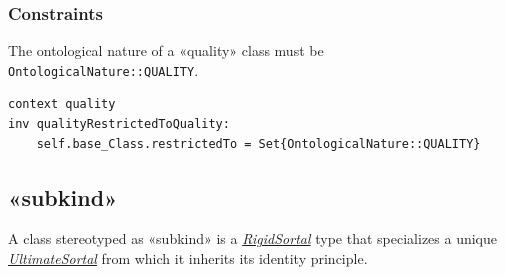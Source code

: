 \subsubsection{Constraints}

\begin{constraint}
\label{modeRestrictedTo}
The ontological nature of a «quality» class must be \texttt{OntologicalNature::QUALITY}.

\begin{lstlisting}[language=OCL]
context quality 
inv qualityRestrictedToQuality:
    self.base_Class.restrictedTo = Set{OntologicalNature::QUALITY}
\end{lstlisting}
\end{constraint}









\subsection{«subkind»}
\label{stereotype:subkind}

A class stereotyped as «subkind» is a \hyperref[stereotype:rigidSortal]{\textit{RigidSortal}} type that specializes a unique \hyperref[stereotype:ultimateSortal]{\textit{UltimateSortal}} from which it inherits its identity principle.

